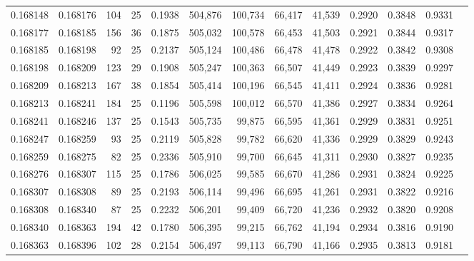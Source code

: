 \begin{tabular}{rrrrrrrrrrrrr}
0.168148 & 0.168176 & 104 &  25 &                                     0.1938 & 504,876 & 100,734 &  66,417 &  41,539 & 0.2920 & 0.3848 & 0.9331 \\
0.168177 & 0.168185 & 156 &  36 &                                     0.1875 & 505,032 & 100,578 &  66,453 &  41,503 & 0.2921 & 0.3844 & 0.9317 \\
0.168185 & 0.168198 &  92 &  25 &                                     0.2137 & 505,124 & 100,486 &  66,478 &  41,478 & 0.2922 & 0.3842 & 0.9308 \\
0.168198 & 0.168209 & 123 &  29 &                                     0.1908 & 505,247 & 100,363 &  66,507 &  41,449 & 0.2923 & 0.3839 & 0.9297 \\
0.168209 & 0.168213 & 167 &  38 &                                     0.1854 & 505,414 & 100,196 &  66,545 &  41,411 & 0.2924 & 0.3836 & 0.9281 \\
0.168213 & 0.168241 & 184 &  25 &                                     0.1196 & 505,598 & 100,012 &  66,570 &  41,386 & 0.2927 & 0.3834 & 0.9264 \\
0.168241 & 0.168246 & 137 &  25 &                                     0.1543 & 505,735 &  99,875 &  66,595 &  41,361 & 0.2929 & 0.3831 & 0.9251 \\
0.168247 & 0.168259 &  93 &  25 &                                     0.2119 & 505,828 &  99,782 &  66,620 &  41,336 & 0.2929 & 0.3829 & 0.9243 \\
0.168259 & 0.168275 &  82 &  25 &                                     0.2336 & 505,910 &  99,700 &  66,645 &  41,311 & 0.2930 & 0.3827 & 0.9235 \\
0.168276 & 0.168307 & 115 &  25 &                                     0.1786 & 506,025 &  99,585 &  66,670 &  41,286 & 0.2931 & 0.3824 & 0.9225 \\
0.168307 & 0.168308 &  89 &  25 &                                     0.2193 & 506,114 &  99,496 &  66,695 &  41,261 & 0.2931 & 0.3822 & 0.9216 \\
0.168308 & 0.168340 &  87 &  25 &                                     0.2232 & 506,201 &  99,409 &  66,720 &  41,236 & 0.2932 & 0.3820 & 0.9208 \\
0.168340 & 0.168363 & 194 &  42 &                                     0.1780 & 506,395 &  99,215 &  66,762 &  41,194 & 0.2934 & 0.3816 & 0.9190 \\
0.168363 & 0.168396 & 102 &  28 &                                     0.2154 & 506,497 &  99,113 &  66,790 &  41,166 & 0.2935 & 0.3813 & 0.9181 \\

\end{tabular}

